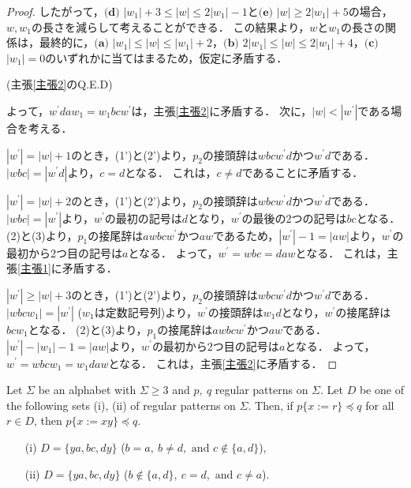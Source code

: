 \begin{proof}
  したがって，$\textbf{(d)}$ $|w_{1}|+3 \le |w| \le 2|w_{1}|-1$と$\textbf{(e)}$ $|w| \ge 2|w_{1}|+5$の場合，$w,w_{1}$の長さを減らして考えることができる．
  この結果より，$w$と$w_{1}$の長さの関係は，最終的に，$\textbf{(a)}$ $|w_{1}| \le |w| \le |w_{1}|+2$，$\textbf{(b)}$ $2|w_{1}| \le |w| \le 2|w_{1}|+4$，$\textbf{(c)}$ $|w_{1}|=0$のいずれかに当てはまるため，仮定に矛盾する．
  
  \hspace{\fill}\rm{(主張\ref{主張2}のQ.E.D)}
  
  よって，$w^{\prime}daw_{1}=w_{1}bcw^{\prime}$は，主張\ref{主張2}に矛盾する．
  次に，$|w| < |w^{\prime}|$である場合を考える．
  
  $|w^{\prime}|=|w|+1$のとき，(1')と(2')より，$p_{2}$の接頭辞は$wbcw^{\prime}d$かつ$w^{\prime}d$である．
  $|wbc|=|w^{\prime}d|$より，$c=d$となる．
  これは，$c \ne d$であることに矛盾する．
  
  $|w^{\prime}|=|w|+2$のとき，(1')と(2')より，$p_{2}$の接頭辞は$wbcw^{\prime}d$かつ$w^{\prime}d$である．
  $|wbc|=|w^{\prime}|$より，$w^{\prime}$の最初の記号は$d$となり，$w^{\prime}$の最後の2つの記号は$bc$となる．
  (2)と(3)より，$p_{1}$の接尾辞は$awbcw^{\prime}$かつ$aw$であるため，$|w^{\prime}|-1=|aw|$より，$w^{\prime}$の最初から2つ目の記号は$a$となる．
  よって，$w^{\prime}=wbc=daw$となる．
  これは，主張\ref{主張1}に矛盾する．
  
  $|w^{\prime}| \ge |w|+3$のとき，(1')と(2')より，$p_{2}$の接頭辞は$wbcw^{\prime}d$かつ$w^{\prime}d$である．
  $|wbcw_{1}|=|w^{\prime}|$ ($w_{1}$は定数記号列)より，$w^{\prime}$の接頭辞は$w_{1}d$となり，$w^{\prime}$の接尾辞は$bcw_{1}$となる．
  (2)と(3)より，$p_{1}$の接尾辞は$awbcw^{\prime}$かつ$aw$である．
  $|w^{\prime}|-|w_{1}|-1=|aw|$より，$w^{\prime}$の最初から2つ目の記号は$a$となる．
  よって，$w^{\prime}=wbcw_{1}=w_{1}daw$となる．
  これは，主張\ref{主張2}に矛盾する．
  \end{proof}
  
  



\begin{lem}\label{片方}
Let $\Sigma$ be an alphabet with $\Sigma \ge 3$ and $p,~q$ regular patterns on $\Sigma$.
Let $D$ be one of the following sets \textrm{(i), (ii)} of regular patterns on $\Sigma$.
Then, if $p \{ x := r \} \preceq q$ for all $r \in D$, then $p \{ x := xy \} \preceq q$.
\begin{enumerate}
\item[{\rm (i)}] $D=\{ ya, bc, dy \}$ ($b = a,~b \not= d,\mbox{~and~}c \not\in \{a,d\}$),
\item[{\rm (ii)}] $D=\{ ya, bc, dy \}$ ($b \not\in \{a,d\},~c = d,\mbox{~and~} c \not = a$).
\end{enumerate}
\end{lem}

